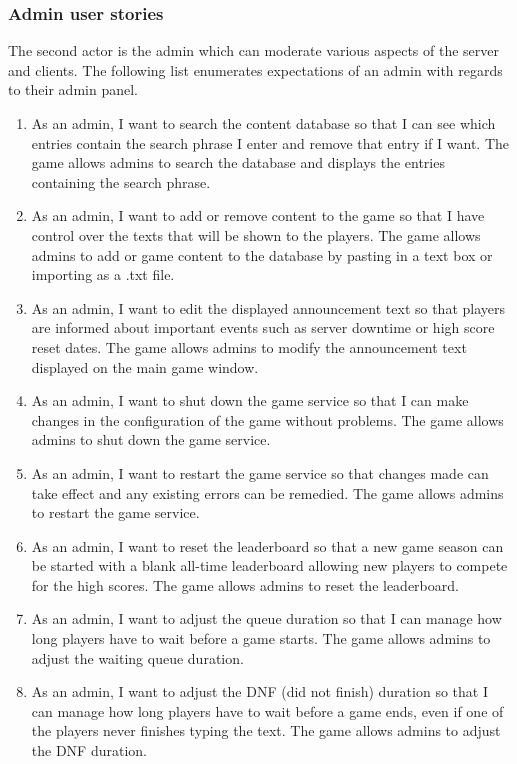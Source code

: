 \documentclass[titlepage]{article}
\begin{document}
\subsubsection{Admin user stories}

The second actor is the admin which can moderate various aspects of the server and clients. The following list enumerates expectations of an admin with regards to their admin panel.

\begin{enumerate}
	\item
	      As an admin, I want to search the content database so that I can see which entries contain the search phrase I enter and remove that entry if I want.
	      \AC
	      The game allows admins to search the database and displays the entries containing the search phrase.

	\item
	      As an admin, I want to add or remove content to the game so that I have control over the texts that will be shown to the players.
	      \AC
	      The game allows admins to add or game content to the database by pasting in a text box or importing as a .txt file.

	\item
	      As an admin, I want to edit the displayed announcement text so that players are informed about important events such as server downtime or high score reset dates.
	      \AC
	      The game allows admins to modify the announcement text displayed on the main game window.

	\item
	      As an admin, I want to shut down the game service so that I can make changes in the configuration of the game without problems.
	      \AC
	      The game allows admins to shut down the game service.

	\item
	      As an admin, I want to restart the game service so that changes made can take effect and any existing errors can be remedied.
	      \AC
	      The game allows admins to restart the game service.

	\item
	      As an admin, I want to reset the leaderboard so that a new game season can be started with a blank all-time leaderboard allowing new players to compete for the high scores.
	      \AC
	      The game allows admins to reset the leaderboard.

	\item
	      As an admin, I want to adjust the queue duration so that I can manage how long players have to wait before a game starts.
	      \AC
	      The game allows admins to adjust the waiting queue duration.

	\item
	      As an admin, I want to adjust the DNF (did not finish) duration so that I can manage how long players have to wait before a game ends, even if one of the players never finishes typing the text.
	      \AC
	      The game allows admins to adjust the DNF duration.
\end{enumerate}
\end{document}
